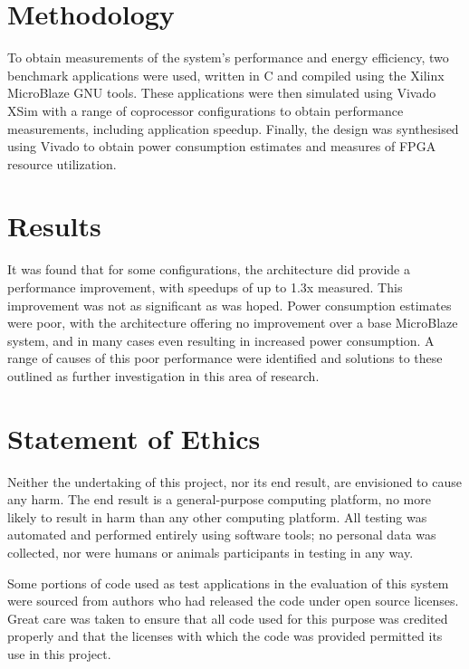 \documentclass{UoYCSproject}
\begin{document}
\begin{summary}
\section{Methodology}

To obtain measurements of the system's performance and energy efficiency, two benchmark applications were used,
written in C and compiled using the Xilinx MicroBlaze GNU tools. These applications were then simulated using Vivado XSim
with a range of coprocessor configurations to obtain performance measurements, including application speedup.
Finally, the design was synthesised using Vivado to obtain power consumption estimates and measures of FPGA resource
utilization.

\section{Results}

It was found that for some configurations, the architecture did provide a performance improvement, with speedups of
up to 1.3x measured. This improvement was not as significant as was hoped. Power consumption estimates were poor,
with the architecture offering no improvement over a base MicroBlaze system, and in many cases even resulting in increased
power consumption. A range of causes of this poor performance were identified and solutions to these outlined as further
investigation in this area of research.

\section{Statement of Ethics}

Neither the undertaking of this project, nor its end result, are envisioned to cause any harm. The end result is
a general-purpose computing platform, no more likely to result in harm than any other computing platform.
All testing was automated and performed entirely using software tools; no personal data was collected, nor were humans
or animals participants in testing in any way.

Some portions of code used as test applications in the evaluation of this system were sourced
from authors who had released the code under open source licenses. Great care was taken to ensure that all
code used for this purpose was credited properly and that the licenses with which the code was
provided permitted its use in this project.

\end{summary}
\end{document}
